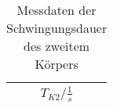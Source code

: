 \begin{table}[h!]
  \centering
  \caption{Messdaten der Schwingungsdauer des zweitem Körpers}
  \label{tab:körper2}
  \begin{tabular}{c}
    \toprule
     $T_{K2}/\si{\frac{1}{s}}$\\
    \midrule
      
    \bottomrule
  \end{tabular}
\end{table}
